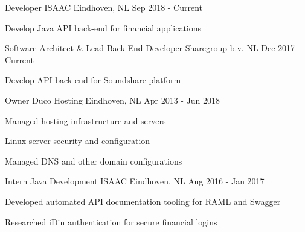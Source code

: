 \vspace{2mm}

\begin{cventries}
\cventry
  {Developer}
  {ISAAC}
  {Eindhoven, NL}
  {Sep 2018 - Current}
  {
    \begin{cvitems}
      \item {Develop Java API back-end for financial applications}
    \end{cvitems}
  }
  \vspace{4mm}

\cventry
  {Software Architect \& Lead Back-End Developer} %
  {Sharegroup b.v.} %
  {NL} %
  {Dec 2017 - Current} %
  {
    \begin{cvitems} %
      \item {Develop API back-end for Soundshare platform}
    \end{cvitems}
  }
  \vspace{4mm}
  
\cventry
  {Owner} %
  {Duco Hosting} %
  {Eindhoven, NL} %
  {Apr 2013 - Jun 2018} %
  {
    \begin{cvitems} %
      \item {Managed hosting infrastructure and servers}
      \item {Linux server security and configuration}
      \item {Managed DNS and other domain configurations}
    \end{cvitems}
  }
  \vspace{4mm}

  \cventry
    {Intern Java Development} %
    {ISAAC} %
    {Eindhoven, NL} %
    {Aug 2016 - Jan 2017} %
    {
      \begin{cvitems} %
        \item {Developed automated API documentation tooling for RAML and Swagger}
        \item {Researched iDin authentication for secure financial logins}
      \end{cvitems}
    }
    \vspace{4mm}


\end{cventries}

